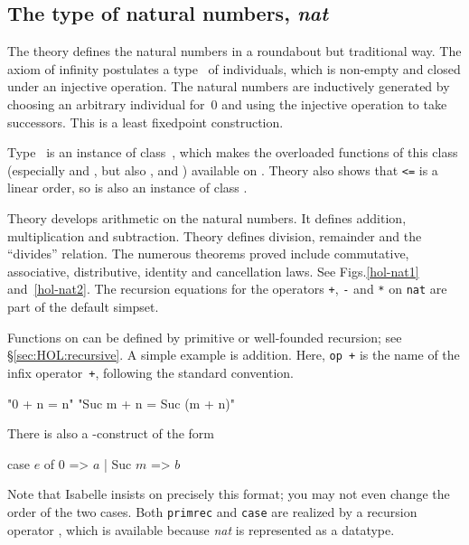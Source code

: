 \subsection{The type of natural numbers, \textit{nat}}

The theory  defines the natural numbers in a roundabout but
traditional way.  The axiom of infinity postulates a type~ of
individuals, which is non-empty and closed under an injective operation.  The
natural numbers are inductively generated by choosing an arbitrary individual
for~0 and using the injective operation to take successors.  This is a least
fixedpoint construction.  

Type~ is an instance of class~, which makes the overloaded
functions of this class (especially \cdx{<} and \cdx{<=}, but also ,
 and ) available on .  Theory  
also shows that {\tt<=} is a linear order, so  is
also an instance of class .

Theory  develops arithmetic on the natural numbers.  It defines
addition, multiplication and subtraction.  Theory  defines
division, remainder and the ``divides'' relation.  The numerous theorems
proved include commutative, associative, distributive, identity and
cancellation laws.  See Figs.\ts\ref{hol-nat1} and~\ref{hol-nat2}.  The
recursion equations for the operators \texttt{+}, \texttt{-} and \texttt{*} on
\texttt{nat} are part of the default simpset.

Functions on  can be defined by primitive or well-founded recursion;
see {\S}\ref{sec:HOL:recursive}.  A simple example is addition.
Here, \texttt{op +} is the name of the infix operator~\texttt{+}, following
the standard convention.
\begin{ttbox}
      "0 + n = n"
  "Suc m + n = Suc (m + n)"
\end{ttbox}
There is also a -construct
of the form
\begin{ttbox}
case \(e\) of 0 => \(a\) | Suc \(m\) => \(b\)
\end{ttbox}
Note that Isabelle insists on precisely this format; you may not even change
the order of the two cases.
Both \texttt{primrec} and \texttt{case} are realized by a recursion operator
, which is available because \textit{nat} is represented as
a datatype.


